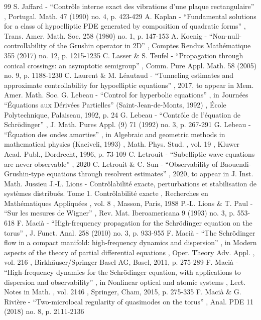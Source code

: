 \documentclass[10pt]{amsart}
\theoremstyle{plain}
\theoremstyle{definition}
\begin{document}
\begin{thebibliography}{99}
 S. Jaffard - “Contrôle interne exact des vibrations d’une plaque rectangulaire” , Portugal. Math. 47 (1990) no. 4, p. 423-429
 A. Kaplan - “Fundamental solutions for a class of hypoelliptic PDE generated by composition of quadratic forms” , Trans. Amer. Math. Soc. 258 (1980) no. 1, p. 147-153
 A. Koenig - “Non-null-controllability of the Grushin operator in 2D” , Comptes Rendus Mathématique 355 (2017) no. 12, p. 1215-1235
 C. Lasser \& S. Teufel - “Propagation through conical crossings: an asymptotic semigroup” , Comm. Pure Appl. Math. 58 (2005) no. 9, p. 1188-1230
 C. Laurent \& M. Léautaud - “Tunneling estimates and approximate controllability for hypoelliptic equations” , 2017, to appear in Mem. Amer. Math. Soc.
 G. Lebeau - “Control for hyperbolic equations” , in Journées “Équations aux Dérivées Partielles” (Saint-Jean-de-Monts, 1992) , École Polytechnique, Palaiseau, 1992, p. 24
 G. Lebeau - “Contrôle de l’équation de Schrödinger” , J. Math. Pures Appl. (9) 71 (1992) no. 3, p. 267-291
 G. Lebeau - “Équation des ondes amorties” , in Algebraic and geometric methods in mathematical physics (Kaciveli, 1993) , Math. Phys. Stud. , vol. 19 , Kluwer Acad. Publ., Dordrecht, 1996, p. 73-109
 C. Letrouit - “Subelliptic wave equations are never observable” , 2020
 C. Letrouit \& C. Sun - “Observability of Baouendi-Grushin-type equations through resolvent estimates” , 2020, to appear in J. Inst. Math. Jussieu
 J.-L. Lions - Contrôlabilité exacte, perturbations et stabilisation de systèmes distribués. Tome 1. Contrôlabilité exacte , Recherches en Mathématiques Appliquées , vol. 8 , Masson, Paris, 1988
 P.-L. Lions \& T. Paul - “Sur les mesures de Wigner” , Rev. Mat. Iberoamericana 9 (1993) no. 3, p. 553-618
 F. Macià - “High-frequency propagation for the Schrödinger equation on the torus” , J. Funct. Anal. 258 (2010) no. 3, p. 933-955
 F. Macià - “The Schrödinger flow in a compact manifold: high-frequency dynamics and dispersion” , in Modern aspects of the theory of partial differential equations , Oper. Theory Adv. Appl. , vol. 216 , Birkhäuser/Springer Basel AG, Basel, 2011, p. 275-289
 F. Macià - “High-frequency dynamics for the Schrödinger equation, with applications to dispersion and observability” , in Nonlinear optical and atomic systems , Lect. Notes in Math. , vol. 2146 , Springer, Cham, 2015, p. 275-335
 F. Macià \& G. Rivière - “Two-microlocal regularity of quasimodes on the torus” , Anal. PDE 11 (2018) no. 8, p. 2111-2136

\end{thebibliography}
\end{document}
